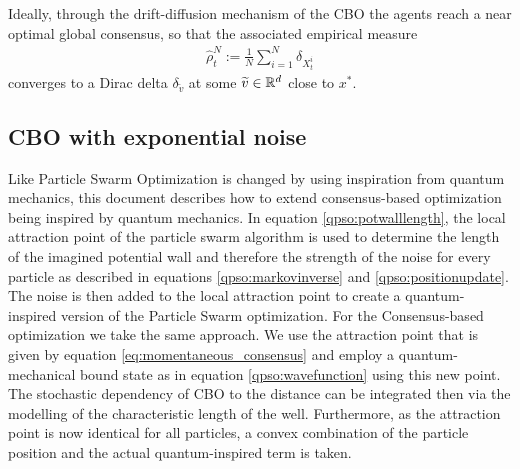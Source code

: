 \documentclass[a4paper, 11pt]{article}
\newcommand{\globmin}{x^*}
\newcommand{\empmeasure}[1]{\widehat\rho_{#1}^N}
\begin{document}
Ideally, through the drift-diffusion mechanism of the CBO the agents reach a near optimal global consensus, so that the associated empirical measure
\begin{align} \label{eq:empirical_measure}
    \empmeasure{t} := \frac{1}{N} \sum_{i=1}^{N} \delta_{X_t^i}
\end{align}
converges to a Dirac delta $\delta_{\widetilde v}$ at some $\widetilde v \in \mathbb{R}^d$ close to $\globmin$.


\subsection{CBO with exponential noise}
Like Particle Swarm Optimization is changed by using inspiration from quantum mechanics, this document describes how to extend consensus-based optimization being inspired by quantum mechanics. In equation \eqref{qpso:potwalllength}, the local attraction point of the particle swarm algorithm is used to determine the length of the imagined potential wall and therefore the strength of the noise for every particle as described in equations \eqref{qpso:markovinverse} and \eqref{qpso:positionupdate}.
The noise is then added to the local attraction point to create a quantum-inspired version of the Particle Swarm optimization. 
For the Consensus-based optimization we take the same approach. We use the attraction point that is given by equation \eqref{eq:momentaneous_consensus} and employ a quantum-mechanical bound state as in equation \eqref{qpso:wavefunction} using this new point. The stochastic dependency of CBO to the distance can be integrated then via the modelling of the characteristic length of the well. Furthermore, as the attraction point is now identical for all particles, a convex combination of the particle position and the actual quantum-inspired term is taken.
\end{document}
